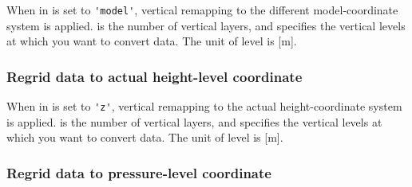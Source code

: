 When  in 
is set to \verb|'model'|, vertical remapping to the different model-coordinate system is applied.
 is the number of vertical layers,
and  specifies the vertical levels at which you want to convert data.
The unit of level is [m].

\subsubsection{Regrid data to actual height-level coordinate}

%

When  in 
is set to \verb|'z'|, vertical remapping to the actual height-coordinate system is applied.
 is the number of vertical layers,
and  specifies the vertical levels at which you want to convert data.
The unit of level is [m].

\subsubsection{Regrid data to pressure-level coordinate}

